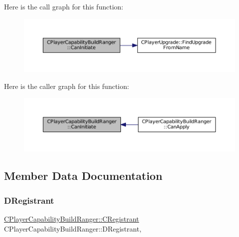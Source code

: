 Here is the call graph for this function\+:\nopagebreak
\begin{figure}[H]
\begin{center}
\leavevmode
\includegraphics[width=350pt]{classCPlayerCapabilityBuildRanger_ad8b45a3ffc7ee82d5550cc690823d82c_cgraph}
\end{center}
\end{figure}
Here is the caller graph for this function\+:\nopagebreak
\begin{figure}[H]
\begin{center}
\leavevmode
\includegraphics[width=350pt]{classCPlayerCapabilityBuildRanger_ad8b45a3ffc7ee82d5550cc690823d82c_icgraph}
\end{center}
\end{figure}


\subsection{Member Data Documentation}
\hypertarget{classCPlayerCapabilityBuildRanger_a612ac35d629ed8c0ef38d52d26aee222}{}\label{classCPlayerCapabilityBuildRanger_a612ac35d629ed8c0ef38d52d26aee222} 
\subsubsection{\texorpdfstring{D\+Registrant}{DRegistrant}}
{\footnotesize\ttfamily \hyperlink{classCPlayerCapabilityBuildRanger_1_1CRegistrant}{C\+Player\+Capability\+Build\+Ranger\+::\+C\+Registrant} C\+Player\+Capability\+Build\+Ranger\+::\+D\+Registrant\hspace{0.3cm}{\ttfamily [static]}, {\ttfamily [protected]}}



